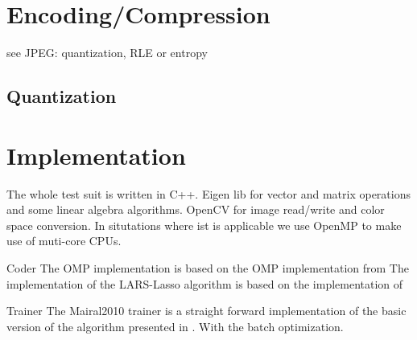 \section{Encoding/Compression}
see JPEG: quantization, RLE or entropy

\subsection{Quantization}


\section{Implementation}

The whole test suit is written in C++.
Eigen lib for vector and matrix operations and some linear algebra algorithms.
OpenCV for image read/write and color space conversion.
In situtations where ist is applicable we use OpenMP to make use of muti-core CPUs. 

Coder
The OMP implementation is based on the OMP implementation from \cite{OMPBox}
The implementation of the LARS-Lasso algorithm is based on the implementation of \cite{lars.m}

Trainer
The Mairal2010 trainer is a straight forward implementation of the basic version of the algorithm presented in \cite{Mairal2010}.
With the batch optimization.



